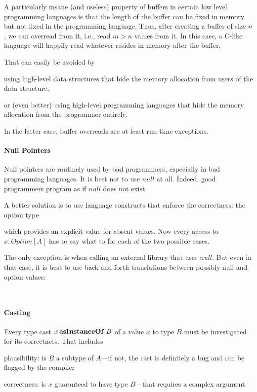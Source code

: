 A particularly insane (and useless) property of buffers in certain low level programming languages is that the length of the buffer can be fixed in memory but not fixed in the programming language.
Thus, after creating a buffer of size $n$, we can overread from it, i.e., read $m>n$ values from it.
In this case, a C-like language will happily read whatever resides in memory after the buffer.

That can easily be avoided by
\begin{compactitem}
 \item using high-level data structures that hide the memory allocation from users of the data structure,
 \item or (even better) using high-level programming languages that hide the memory allocation from the programmer entirely.
\end{compactitem}
In the latter case, buffer overreads are at least run-time exceptions.

\paragraph{Null Pointers}
Null pointers are routinely used by bad programmers, especially in bad programming languages.
It is best not to use $null$ at all.
Indeed, good programmers program as if $null$ does not exist.

A better solution is to use language constructs that enforce the correctness: the option type
\begin{acode}
\end{acode}
which provides an explicit value for absent values.
Now every access to $x:Option[A]$ has to say what to for each of the two possible cases.

The only exception is when calling an external library that uses $null$.
But even in that case, it is best to use back-and-forth translations between possibly-null and option values:
\begin{acode}
\\
\end{acode}

\paragraph{Casting}
Every type cast $x \,{\rm \bf asInstanceOf}\; B$ of a value $x$ to type $B$ must be investigated for its correctness.
That includes 
\begin{compactitem}
 \item plausibility: is $B$ a subtype of $A$---if not, the cast is definitely a bug and can be flagged by the compiler
 \item correctness: is $x$ guaranteed to have type $B$---that requires a complex argument.
\end{compactitem}

